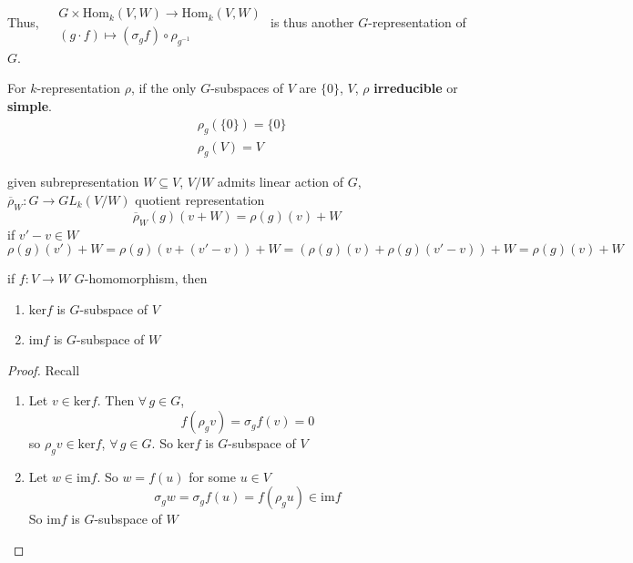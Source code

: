 Thus,  $\begin{aligned} & \quad \\
& G \times \text{Hom}_k(V,W) \to \text{Hom}_k(V,W) \\ 
& (g\cdot f) \mapsto (\sigma_g f)\circ \rho_{g^{-1}} \end{aligned}$ is thus another $G$-representation of $G$.  

For $k$-representation $\rho$, if the only $G$-subspaces of $V$ are $\lbrace 0 \rbrace$, $V$, $\rho$ \textbf{irreducible} or \textbf{simple}.  
\[
\begin{aligned}
& \rho_g(\lbrace 0 \rbrace) = \lbrace 0 \rbrace \\ 
&  \rho_g(V) = V
\end{aligned}
\]


given subrepresentation $W \subseteq V$, $V/W$ admits linear action of $G$, $\overline{\rho}_W : G \to GL_k(V/W)$ quotient representation 
\[
\overline{\rho}_W(g)(v+W) = \rho(g)(v) + W
\]
if $v'-v \in W$
\[
\rho(g)(v') + W = \rho(g)(v+(v'-v))+W = (\rho(g)(v) + \rho(g)(v'-v) ) + W = \rho(g)(v) + W
\]
\begin{proposition} \label{dgdt:Prop:Baker2.7}
	if $f:V \to W$ $G$-homomorphism, then
	\begin{enumerate}
		\item[(a)] $\text{ker}{f}$ is $G$-subspace of $V$ 
		\item[(b)] $\text{im}{f}$ is $G$-subspace of $W$
	\end{enumerate}
\end{proposition}

\begin{proof}
	Recall 
	
	\begin{enumerate}
		\item[(a)] Let $v\in \text{ker}{f}$.  Then $\forall \, g \in G$, 
		\[
		f(\rho_g v) = \sigma_g f(v) = 0 
		\]
		so $\rho_g v \in \text{ker}{f}$, $\forall \, g \in G$.  So $\text{ker}{f}$ is $G$-subspace of $V$
		\item[(b)] Let $w\in \text{im}{f}$.  So $w = f(u)$ for some $u \in V$ 
		\[
		\sigma_g w = \sigma_g f(u) = f(\rho_gu) \in \text{im}f
		\]
		So $\text{im}{f}$ is $G$-subspace of $W$
	\end{enumerate}
\end{proof}

